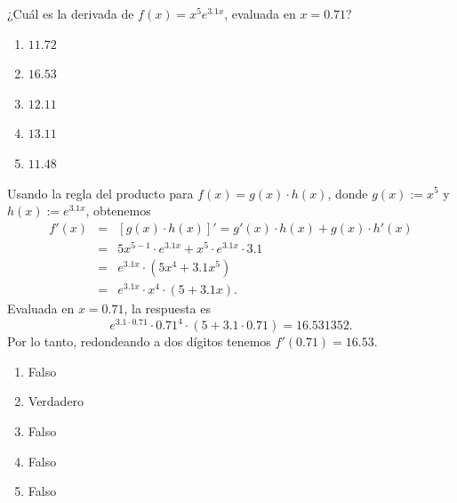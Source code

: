 \documentclass[a4paper]{article}
\newenvironment{question}{}{}
\newenvironment{solution}{}{}
\newenvironment{answerlist}{\begin{enumerate}}{\end{enumerate}}
\begin{document}



\begin{question}
¿Cuál es la derivada de $f(x) = x^{5} e^{3.1x}$, evaluada en $x = 0.71$?

\begin{answerlist}
  \item $11.72$
  \item $16.53$
  \item $12.11$
  \item $13.11$
  \item $11.48$
\end{answerlist}\end{question}

\begin{solution}
Usando la regla del producto para $f(x) = g(x) \cdot h(x)$, donde $g(x) := x^{5}$ y $h(x) := e^{3.1x}$, obtenemos
\begin{eqnarray*}
f'(x) & = & [g(x) \cdot h(x)]' = g'(x) \cdot h(x) + g(x) \cdot h'(x) \\
      & = & 5 x^{5 - 1} \cdot e^{3.1x} + x^{5} \cdot e^{3.1x} \cdot 3.1 \\
      & = & e^{3.1x} \cdot(5 x^4 + 3.1 x^{5}) \\
      & = & e^{3.1x} \cdot x^4 \cdot (5 + 3.1x).
\end{eqnarray*}
Evaluada en $x = 0.71$, la respuesta es
\[ e^{3.1\cdot 0.71} \cdot 0.71^4 \cdot (5 + 3.1\cdot 0.71) = 16.531352. \]
Por lo tanto, redondeando a dos dígitos tenemos $f'(0.71) = 16.53$.

\begin{answerlist}
  \item Falso
  \item Verdadero
  \item Falso
  \item Falso
  \item Falso
\end{answerlist}\end{solution}

\end{document}
